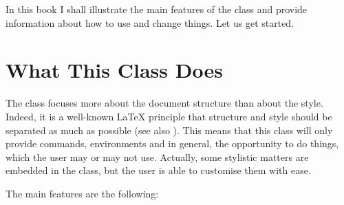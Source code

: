 In this book I shall illustrate the main features of the class and 
provide information about how to use and change things. Let us get 
started.

\section{What This Class Does}

The  class focuses more about the document structure than 
about the style. Indeed, it is a well-known \LaTeX\xspace principle that 
structure and style should be separated as much as possible (see also 
). This means that this class will only provide 
commands, environments and in general, the opportunity to do things, 
which the user may or may not use. Actually, some stylistic matters are 
embedded in the class, but the user is able to customise them with ease.

The main features are the following:

